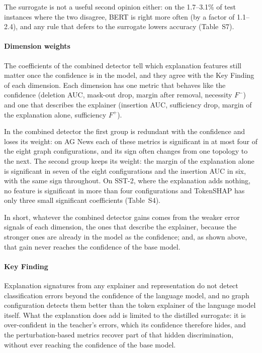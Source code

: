 The surrogate is not a useful second opinion either: on the 1.7--3.1\% of test instances where the two disagree, BERT is right more often (by a factor of 1.1--2.4), and any rule that defers to the surrogate lowers accuracy (Table~S7).

\paragraph{Dimension weights}
The coefficients of the combined detector tell which explanation features still matter once the confidence is in the model, and they agree with the Key Finding of each dimension. Each dimension has one metric that behaves like the confidence (deletion AUC, mask-out drop, margin after removal, necessity \(F^{-}\)) and one that describes the explainer (insertion AUC, sufficiency drop, margin of the explanation alone, sufficiency \(F^{+}\)).

In the combined detector the first group is redundant with the confidence and loses its weight: on AG News each of these metrics is significant in at most four of the eight graph configurations, and its sign often changes from one topology to the next. The second group keeps its weight: the margin of the explanation alone is significant in seven of the eight configurations and the insertion AUC in six, with the same sign throughout. On SST-2, where the explanation adds nothing, no feature is significant in more than four configurations and TokenSHAP has only three small significant coefficients (Table~S4).

In short, whatever the combined detector gains comes from the weaker error signals of each dimension, the ones that describe the explainer, because the stronger ones are already in the model as the confidence; and, as shown above, that gain never reaches the confidence of the base model.

\paragraph{\textbf{Key Finding}}
Explanation signatures from any explainer and representation do not detect classification errors beyond the confidence of the language model, and no graph configuration detects them better than the token explainer of the language model itself. What the explanation does add is limited to the distilled surrogate: it is over-confident in the teacher's errors, which its confidence therefore hides, and the perturbation-based metrics recover part of that hidden discrimination, without ever reaching the confidence of the base model.

